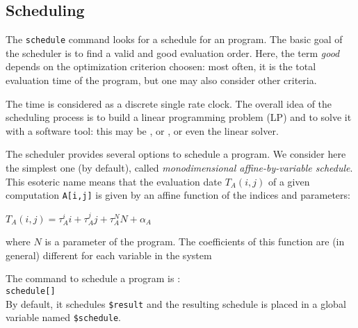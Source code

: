 \subsection{Scheduling}
\label{schedule}

The {\tt schedule} command looks for a schedule for an {\Alpha}
program.  The basic goal of the scheduler is to find a valid and good
evaluation order. Here, the term {\em good} depends on the
optimization criterion choosen: most often, it is the total evaluation
time of the program, but one may also consider other criteria.

The time is considered as a discrete single rate clock. The overall
idea of the scheduling process is to build a linear programming
problem (LP) and to solve it with a software tool: 
this may be \pip{}\cite{pip}, or \lpsolve{}\cite{lpsolve}, or even the \mma{}
linear solver. 

The \alfa{} scheduler provides several options to schedule 
a program. We consider here 
the simplest one (by default), called 
{\em  monodimensional affine-by-variable schedule}. 
This esoteric name means 
that the evaluation date $T_A(i,j)$ of a given computation
\texttt{A[i,j]}  
is given by an affine
function of the indices and parameters:\\
\centerline{ $T_{A}(i,j) =
\tau^i_{A} i + \tau^j_{A} j+ \tau^N_{A} N +
\alpha_{A}$} where $N$ is a 
parameter of the {\Alpha} program.
The coefficients of this function
are (in general) different for each variable in the system 

The command to schedule a program is :\\ 
\texttt{schedule[]}\\By default, it schedules {\tt \$result}
and the resulting schedule is
placed in a global variable named {\tt \$schedule}. 

